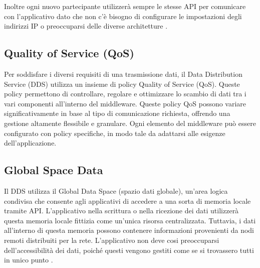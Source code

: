 Inoltre ogni nuovo partecipante 
utilizzerà sempre le stesse API per comunicare con l'applicativo dato che 
non c'è bisogno di configurare le impostazioni degli indirizzi IP o 
preoccuparsi delle diverse architetture \cite{1494965}.
 
 
\subsection{Quality of Service (QoS)}

Per soddisfare i diversi requisiti di una trasmissione dati, 
il Data Distribution Service (DDS) utilizza un insieme di policy
Quality of Service (QoS). Queste policy permettono di controllare, 
regolare e ottimizzare lo scambio di dati tra i vari componenti 
all'interno del middleware. Queste policy QoS possono variare 
significativamente in base al tipo di comunicazione richiesta, 
offrendo una gestione altamente flessibile e granulare. 
Ogni elemento del middleware può essere configurato 
con policy specifiche, in modo tale da adattarsi alle 
esigenze dell'applicazione.

\subsection{Global Space Data}
Il DDS utilizza il Global Data 
Space (spazio dati globale), un'area logica condivisa 
che consente agli applicativi
di accedere a una sorta di memoria locale tramite API.
L'applicativo nella scrittura o nella ricezione dei dati utilizzerà 
questa memoria locale fittizia come un'unica risorsa centralizzata.
Tuttavia, i dati all'interno di questa memoria possono contenere
informazioni provenienti da nodi remoti distribuiti per la rete. 
L'applicativo non deve cosi preoccuparsi dell'accessibilità dei dati,
poiché questi vengono gestiti come se si trovassero tutti in unico punto 
\cite{whatisdds}.


